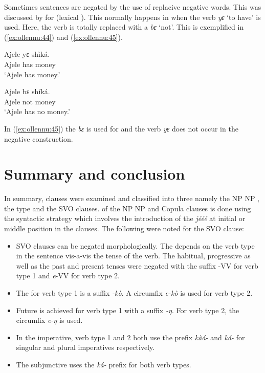 \documentclass[output=paper
,newtxmath
,modfonts
,nonflat]{langsci/langscibook}
\begin{document}
Sometimes sentences are negated by the use of replacive negative words. This was discussed by \citet[23]{caesar2012} for  (lexical ). This normally happens in  when the verb \textit{yɛ} `to have' is used. Here, the verb is totally replaced with a  \textit{bɛ} `not'. This is exemplified in (\ref{ex:ollennu:44}) and (\ref{ex:ollennu:45}).

\begin{minipage}{.5\textwidth}
\ea \label{ex:ollennu:44}
\gll Ajele yɛ sh\`ik\'a.\\
Ajele has money\\
\glt `Ajele has money.'
\z
\end{minipage}
\begin{minipage}{.5\textwidth}
\ea \label{ex:ollennu:45}
\gll Ajele bɛ sh\'ik\'a.\\
Ajele not money\\
\glt`Ajele has no money.'
\z
\end{minipage}

In (\ref{ex:ollennu:45}) the  \textit{bɛ} is used for  and the verb \textit{yɛ} does not occur in the negative construction.

\section{\label{sec:ollennu:3} Summary and conclusion}

In summary,  clauses were examined and classified into three namely the NP NP , the  type and the SVO clauses.  of the NP NP and Copula clauses is done using the syntactic strategy which involves the introduction of the  \textit{j\'e\'e\'e} at initial or middle position in the clauses. The following were noted for the SVO clause:
\begin{itemize}
\item {} SVO clauses can be negated morphologically. The  depends on the verb type in the sentence vis-a-vis the tense of the verb. The habitual, progressive as well as the past and present tenses were negated with the suffix -VV for verb type 1 and \textit{e}-VV for verb type 2.

\item The   for verb type 1 is a suffix \textit{-k\`o}. A circumfix \textit{e-k\`o} is used for verb type 2.

\item Future  is achieved for verb type 1 with a suffix \textit{-ŋ}. For verb type 2, the circumfix \textit{e-ŋ} is used.

\item In the imperative, verb type 1 and 2 both use the prefix \textit{k\`a\'a-} and \textit{k\'a-} for singular and plural imperatives respectively.

\item The subjunctive  uses the \textit{k\'a-} prefix for both verb types.
\end{itemize}
\end{document}

